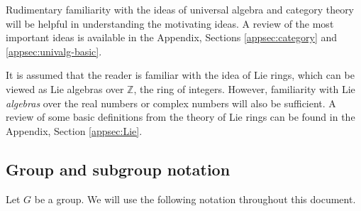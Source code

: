 \documentclass{ucetd}
\begin{document}
Rudimentary familiarity with the ideas of universal algebra and
category theory will be helpful in understanding the motivating
ideas. A review of the most important ideas is available in the
Appendix, Sections \ref{appsec:category} and \ref{appsec:univalg-basic}.

It is assumed that the reader is familiar with the idea of Lie rings,
which can be viewed as Lie algebras over $\mathbb{Z}$, the ring of
integers. However, familiarity with Lie {\em algebras}
over the real numbers or complex numbers will also be sufficient. A
review of some basic definitions from the theory of Lie rings can be
found in the Appendix, Section \ref{appsec:Lie}.

\subsection{Group and subgroup notation}\label{sec:group-notation}

Let $G$ be a group. We will use the following notation throughout this
document.
\end{document}
